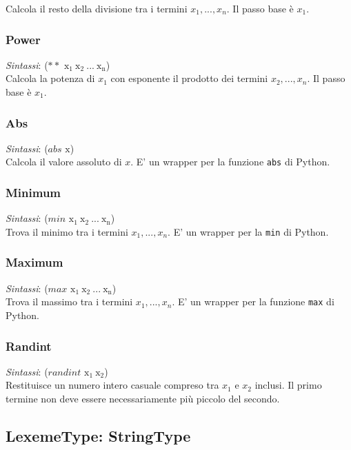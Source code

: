 Calcola il resto della divisione tra i termini $x_1, ..., x_n$. Il passo base è $x_1$.


\subsubsection{Power}
\emph{Sintassi}: ($**$ $ \mathrm{x_1 \ x_2 \ ... \ x_n}$)\\

Calcola la potenza di $x_1$ con esponente il prodotto dei termini $x_2, ..., x_n$. Il passo base è $x_1$.


\subsubsection{Abs}
\emph{Sintassi}: ($abs$ $ \mathrm{x}$)\\

Calcola il valore assoluto di $x$. E' un wrapper per la funzione \verb!abs! di Python.


\subsubsection{Minimum}
\emph{Sintassi}: ($min$ $ \mathrm{x_1 \ x_2 \ ... \ x_n}$)\\

Trova il minimo tra i termini $x_1, ..., x_n$. E' un wrapper per la \verb!min! di Python.


\subsubsection{Maximum}
\emph{Sintassi}: ($max$ $ \mathrm{x_1 \ x_2 \ ... \ x_n}$)\\

Trova il massimo tra i termini $x_1, ..., x_n$. E' un wrapper per la funzione \verb!max! di Python.

\subsubsection{Randint}
\emph{Sintassi}: ($randint$ $ \mathrm{x_1 \ x_2}$)\\

Restituisce un numero intero casuale compreso tra $x_1$ e $x_2$ inclusi. Il primo termine non deve essere necessariamente più piccolo del secondo.

\subsection{LexemeType: StringType}

